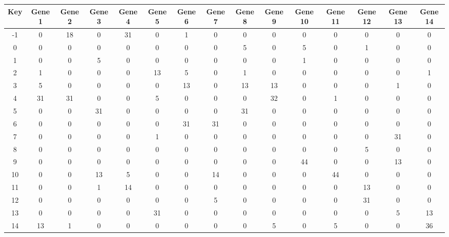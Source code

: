 \begin{tabular}{|c|c|c|c|c|c|c|c|c|c|c|c|c|c|c|}
\hline
Key & Gene 1 & Gene 2 & Gene 3 & Gene 4 & Gene 5 & Gene 6 & Gene 7 & Gene 8 & Gene 9 & Gene 10 & Gene 11 & Gene 12 & Gene 13 & Gene 14 \\
\hline
-1 & 0 & 18 & 0 & 31 & 0 & 1 & 0 & 0 & 0 & 0 & 0 & 0 & 0 & 0 \\
0 & 0 & 0 & 0 & 0 & 0 & 0 & 0 & 5 & 0 & 5 & 0 & 1 & 0 & 0 \\
1 & 0 & 0 & 5 & 0 & 0 & 0 & 0 & 0 & 0 & 1 & 0 & 0 & 0 & 0 \\
2 & 1 & 0 & 0 & 0 & 13 & 5 & 0 & 1 & 0 & 0 & 0 & 0 & 0 & 1 \\
3 & 5 & 0 & 0 & 0 & 0 & 13 & 0 & 13 & 13 & 0 & 0 & 0 & 1 & 0 \\
4 & 31 & 31 & 0 & 0 & 5 & 0 & 0 & 0 & 32 & 0 & 1 & 0 & 0 & 0 \\
5 & 0 & 0 & 31 & 0 & 0 & 0 & 0 & 31 & 0 & 0 & 0 & 0 & 0 & 0 \\
6 & 0 & 0 & 0 & 0 & 0 & 31 & 31 & 0 & 0 & 0 & 0 & 0 & 0 & 0 \\
7 & 0 & 0 & 0 & 0 & 1 & 0 & 0 & 0 & 0 & 0 & 0 & 0 & 31 & 0 \\
8 & 0 & 0 & 0 & 0 & 0 & 0 & 0 & 0 & 0 & 0 & 0 & 5 & 0 & 0 \\
9 & 0 & 0 & 0 & 0 & 0 & 0 & 0 & 0 & 0 & 44 & 0 & 0 & 13 & 0 \\
10 & 0 & 0 & 13 & 5 & 0 & 0 & 14 & 0 & 0 & 0 & 44 & 0 & 0 & 0 \\
11 & 0 & 0 & 1 & 14 & 0 & 0 & 0 & 0 & 0 & 0 & 0 & 13 & 0 & 0 \\
12 & 0 & 0 & 0 & 0 & 0 & 0 & 5 & 0 & 0 & 0 & 0 & 31 & 0 & 0 \\
13 & 0 & 0 & 0 & 0 & 31 & 0 & 0 & 0 & 0 & 0 & 0 & 0 & 5 & 13 \\
14 & 13 & 1 & 0 & 0 & 0 & 0 & 0 & 0 & 5 & 0 & 5 & 0 & 0 & 36 \\
\hline
\end{tabular}